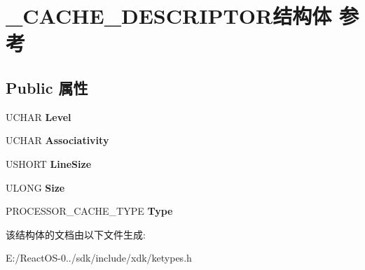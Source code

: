 \hypertarget{struct___c_a_c_h_e___d_e_s_c_r_i_p_t_o_r}{}\section{\+\_\+\+C\+A\+C\+H\+E\+\_\+\+D\+E\+S\+C\+R\+I\+P\+T\+O\+R结构体 参考}
\label{struct___c_a_c_h_e___d_e_s_c_r_i_p_t_o_r}
\subsection*{Public 属性}
\begin{DoxyCompactItemize}
\item 
\mbox{\label{struct___c_a_c_h_e___d_e_s_c_r_i_p_t_o_r_a9abf80c23a5e3b940be9bc6843cd9b30}} 
U\+C\+H\+AR {\bfseries Level}
\item 
\mbox{\label{struct___c_a_c_h_e___d_e_s_c_r_i_p_t_o_r_a1489005d4c8194c42b093e7a216c4933}} 
U\+C\+H\+AR {\bfseries Associativity}
\item 
\mbox{\label{struct___c_a_c_h_e___d_e_s_c_r_i_p_t_o_r_aa04f9942c316f8d4ef69ab987d34542c}} 
U\+S\+H\+O\+RT {\bfseries Line\+Size}
\item 
\mbox{\label{struct___c_a_c_h_e___d_e_s_c_r_i_p_t_o_r_af8e0aa24ac1347fa3b4c62b47e02609b}} 
U\+L\+O\+NG {\bfseries Size}
\item 
\mbox{\label{struct___c_a_c_h_e___d_e_s_c_r_i_p_t_o_r_a3dc672595d3eb01f1171ec5b825ddd2f}} 
P\+R\+O\+C\+E\+S\+S\+O\+R\+\_\+\+C\+A\+C\+H\+E\+\_\+\+T\+Y\+PE {\bfseries Type}
\end{DoxyCompactItemize}


该结构体的文档由以下文件生成\+:\begin{DoxyCompactItemize}
\item 
E\+:/\+React\+O\+S-\/0../sdk/include/xdk/ketypes.\+h\end{DoxyCompactItemize}
